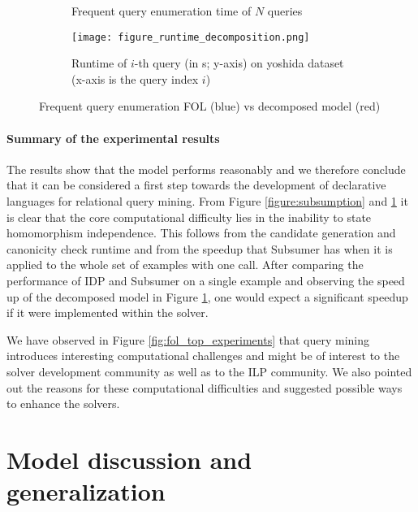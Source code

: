 \begin{figure}[thb]
\begin{center}
\begin{subfigure}{.51\textwidth}
{\begin{tabular}{l l r r r r r}
        \end{tabular}}
        \vspace{3pt}
        \caption{Frequent query enumeration time of $N$ queries}
        \label{table:query_enumeration}
      \end{subfigure}
      \hfill 
      \begin{subfigure}{.48\textwidth}
        \phantom{text}
        \texttt{[image: figure\_runtime\_decomposition.png]}
        \caption{Runtime of $i$-th query (in s; y-axis) on yoshida dataset\\(x-axis is the query index $i$)}
        \label{fig:fol_enumeration_experiments}
      \end{subfigure}
    \end{center}
    \caption{Frequent query enumeration FOL (blue) vs decomposed model (red)}
  \end{figure}

\paragraph{Summary of the experimental results}
The results show that the model performs reasonably and we therefore conclude that it can be considered a first step towards the development of declarative languages for relational query mining. From Figure \ref{figure:subsumption} and \ref{table:query_enumeration} it is clear that the core computational difficulty lies in the inability to state homomorphism independence. 
This follows from the candidate generation and canonicity check runtime and from the speedup that Subsumer has when it is applied to the whole set of examples with one call. After comparing the performance of  IDP and Subsumer on a single example and observing the speed up of the decomposed model in Figure \ref{table:query_enumeration}, one would expect a significant speedup if it were implemented within the solver.

  We have observed in Figure \ref{fig:fol_top_experiments} that query mining introduces interesting computational challenges and might be of interest to the solver development community as well as to the ILP community. We also pointed out the reasons for these computational difficulties and suggested possible ways to enhance the solvers.

\section{Model discussion and generalization}
\label{sec:approach_extension}
